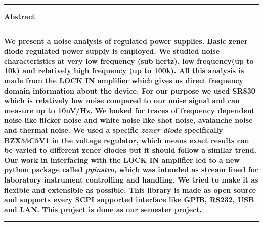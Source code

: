 \begin{table*}[hbt!]\centering
  \vskip50pt
  \parbox[h]{.75\textwidth}{\centering \hrule height 2pt \vskip10pt\Large \textbf{Abstract} \vskip10pt \hrule height 2pt \vskip10pt}
  \parbox[h]{.75\textwidth}{\normalsize \textbf{
       We present a noise analysis of regulated power supplies. Basic zener diode regulated power supply is employed. We studied noise characteristics at very low frequency (sub hertz), low frequency(up to 10k) and relatively high frequency (up to 100k). All this analysis is made from the LOCK IN amplifier which gives us direct frequency domain information about the device. For our purpose we used SR830 which is relatively low noise compared to our noise signal and can measure up to 10nV/Hz. We looked for traces of frequency dependent noise like flicker noise and  white noise like shot noise, avalanche noise and thermal noise. We used a specific \emph{zener diode} specifically BZX55C5V1 in the voltage regulator, which means exact results can be varied to different zener diodes but it should follow a similar trend. Our work in interfacing with the LOCK IN amplifier led to a new python package called \emph{pyinstro}, which was intended as stream lined for laboratory instrument controlling and handling. We tried to make it as flexible and extensible as possible. This library is made as open source and supports every SCPI supported interface like GPIB, RS232, USB and LAN.  This project is done as our semester project. 
} \vskip10pt \hrule height 2pt \vskip10pt}
\end{table*}
\clearpage
\begin{table*}[hbt!]\centering
\vskip20pt
\parbox[h]{.75\textwidth}{\tableofcontents}
\end{table*}
\clearpage
\twocolumn
